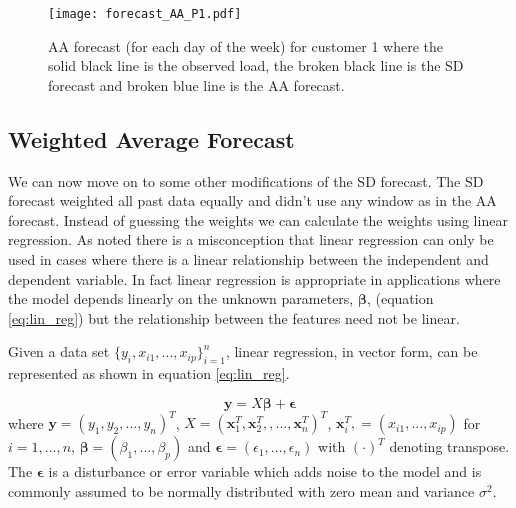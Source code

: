 \begin{figure}
\centering
\texttt{[image: forecast\_AA\_P1.pdf]}
\caption{AA forecast (for each day of the week) for customer 1 where the solid black line is the observed load, the broken black line is the SD forecast and broken blue line is the AA forecast.}
\label{fig:AA_forecast_P1} 
\end{figure}

\subsection{Weighted Average Forecast}

We can now move on to some other modifications of the SD forecast. The SD forecast weighted all past data equally and didn't use any window as in the AA forecast. Instead of guessing the weights we can calculate the weights using linear regression. As \cite{hong16} noted there is a misconception that linear regression can only be used in cases where there is a linear relationship between the independent and dependent variable. In fact linear regression is appropriate in applications where the model depends linearly on the unknown parameters, $\boldsymbol \beta$, (equation \ref{eq:lin_reg}) but the relationship between the features need not be linear.

Given a data set $\{y_i, x_{i1}, ... , x_{ip}\}_{i=1}^n$, linear regression, in vector form, can be represented as shown in equation \ref{eq:lin_reg}.

\begin{equation} \label{eq:lin_reg}
\textbf{y} = X \boldsymbol \beta +\boldsymbol \epsilon
\end{equation}
where $\textbf{y} = (y_1, y_2, ... , y_n)^T $, $X =  (\textbf{x}_1^T, \textbf{x}_2^T,, ... ,\textbf{x}_n^T)^T$,  $\textbf{x}_i^T, = (x_{i1}, ... , x_{ip})$ for $i = 1, ... , n$, $\boldsymbol \beta = (\beta_1 , ... , \beta_p)$ and $\boldsymbol \epsilon = (\epsilon_1, ... , \epsilon_n)$ with $( \cdot )^T$ denoting transpose. The $\boldsymbol \epsilon$ is a disturbance or error variable which adds noise to the model and is commonly assumed to be normally distributed with zero mean and variance $\sigma^2$.

